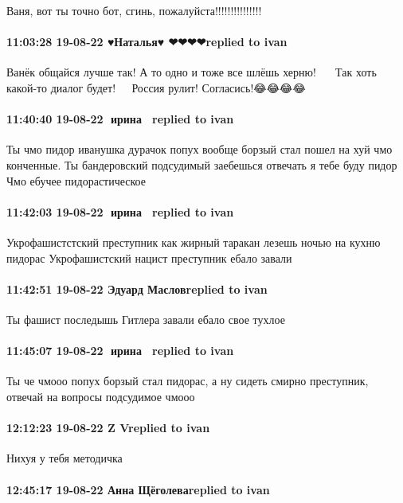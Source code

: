 Ваня, вот ты точно бот, сгинь, пожалуйста!!!!!!!!!!!!!!!

\paragraph{11:03:28 19-08-22 ♥Наталья♥ ❤❤❤❤replied to ivan}

Ванёк общайся лучше так! А то одно и тоже все шлёшь херню! 🤣🤣🤣🤣🤣Так хоть
какой-то диалог будет!🤣🤣🤣🤣
Россия рулит! Согласись!😂😂😂😂

\paragraph{11:40:40 19-08-22 🍏ирина 🍇🍇replied to ivan}

Ты чмо пидор иванушка дурачок попух вообще борзый стал пошел на хуй чмо конченные.
Ты бандеровский подсудимый заебешься отвечать я тебе буду пидор
Чмо ебучее пидорастическое

\paragraph{11:42:03 19-08-22 🍏ирина 🍇🍇replied to ivan}

Укрофашистстский преступник как жирный таракан лезешь ночью на кухню пидорас
Укрофашистский нацист преступник ебало завали

\paragraph{11:42:51 19-08-22 Эдуард Масловreplied to ivan}

Ты фашист последышь Гитлера завали ебало свое тухлое

\paragraph{11:45:07 19-08-22 🍏ирина 🍇🍇replied to ivan}

Ты че чмооо попух борзый стал пидорас, а ну сидеть смирно преступник, отвечай
на вопросы подсудимое чмооо

\paragraph{12:12:23 19-08-22 Z Vreplied to ivan}

Нихуя у тебя методичка 🤣🤣🤣🤣🤣

\paragraph{12:45:17 19-08-22 Анна Щёголеваreplied to ivan}

